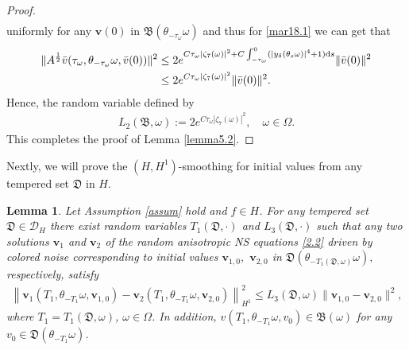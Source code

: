 \documentclass{elsarticle}
\newtheorem{lemma}[theorem]{Lemma}
\theoremstyle{definition}
\numberwithin{equation}{section}
\newcommand{\D}{\mathcal{D}}
\renewcommand{\d}{{\rm{d}}}
\begin{document}
\begin{proof}
\begin{align}
\end{align}
uniformly for any  $\textbf{v}(0) $ in $  \mathfrak B( \theta_{-\tau_\omega} \omega)$ and thus  for \eqref{mar18.1} we can get that
\begin{align*}
  \|
 A^{\frac 12} \bar {v}(\tau_\omega,\theta_{-\tau_\omega}\omega, \bar v(0))  \|^2
&  \leq  2e^{ C \tau_\omega  |\zeta_7( \omega)|^2 + C\int^0_{-\tau_\omega} (|y_\delta(\theta_s\omega)|^4+1) \d s}
   \| \bar v(0)  \|^2  \\
   &\leq 2e^{ C \tau_\omega  |\zeta_7( \omega)|^2 }
   \| \bar v(0)  \|^2.
\end{align*}
Hence, the random variable defined by
\begin{align*}
  L_2(\mathfrak B, \omega):=  2e^{ C \tau_\omega  |\zeta_7( \omega)|^2 }
,\quad \omega\in \Omega.
\end{align*}
This completes the proof of Lemma \ref{lemma5.2}.
\end{proof}


Nextly, we will prove  the   $(H,H^1)$-smoothing for initial values from any tempered set $\mathfrak D$ in $H$.
\begin{lemma} \label{lem:H1}
 Let Assumption \ref{assum} hold and $f\in H$. For   any tempered set   $\mathfrak D\in \D_H$ there exist random variables $ T_1(\mathfrak D ,\cdot )  $ and $L_3(\mathfrak D,\cdot) $ such that any
 two solutions $\textbf{v}_1$ and $\textbf{v}_2$ of  the random anisotropic  NS equations \eqref{2.2} driven by colored noise corresponding to initial values  $\textbf{v}_{1,0},$ $\textbf{v}_{2,0}$ in $ \mathfrak D( \theta_{-T_1(\mathfrak D,\omega)}\omega),$   respectively,  satisfy
\begin{align}\label{mar19.4}
  \left \| \textbf{v}_1  (T_1 ,\theta_{-T_1}\omega,  \textbf{v}_{1,0} )
 - \textbf{v}_2   ( T_1 ,\theta_{-T_1}\omega, \textbf{v}_{2,0} ) \right \|^2_{H^1}
 \leq L_3({\mathfrak D}, \omega) \|\textbf{v}_{1,0}-\textbf{v}_{2,0}\|^2  ,
\end{align}
where $T_1= T_1(\mathfrak D, \omega)$, $\omega\in \Omega$. In addition, $ v (T_1 ,\theta_{-T_1}\omega,  v_{0}) \in \mathfrak B(\omega)$ for any $v_0\in \mathfrak D(\theta_{-T_1}\omega) $.
\end{lemma}
\end{document}
